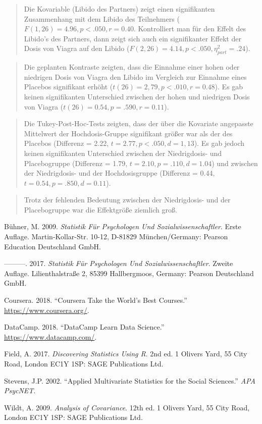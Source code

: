 \documentclass[]{article}
\begin{document}
\begin{quote}
Die Kovariable (Libido des Partners) zeigt einen signifikanten
Zusammenhang mit dem Libido des Teilnehmers
(\(F(1, 26) = 4.96, p < .050, r = 0.40\). Kontrolliert man für den
Effelt des Libido's des Partners, dann zeigt sich auch ein signifikanter
Effekt der Dosis von Viagra auf den Libido
(\(F(2, 26) = 4.14, p < .050, \eta^2_{part} = .24\)).
\end{quote}

\begin{quote}
Die geplanten Kontraste zeigten, dass die Einnahme einer hohen oder
niedrigen Dosis von Viagra den Libido im Vergleich zur Einnahme eines
Placebos signifikant erhöht (\(t(26) = 2,79, p < .010, r = 0.48\)). Es
gab keinen signifikanten Unterschied zwischen der hohen und niedrigen
Dosis von Viagra (\(t(26) = 0.54, p = .590, r = 0.11\)).
\end{quote}

\begin{quote}
Die Tukey-Post-Hoc-Tests zeigten, dass der über die Kovariate angepasste
Mittelwert der Hochdosis-Gruppe signifikant größer war als der des
Placebos (Differenz = 2.22, \(t = 2.77, p < .050, d = 1,13\)). Es gab
jedoch keinen signifikanten Unterschied zwischen der Niedrigdosis- und
Placebogruppe (Differenz = 1.79, \(t = 2.10, p = .110, d = 1.04\)) und
zwischen der Niedrigdosis- und der Hochdosisgruppe (Differenz = 0.44,
\(t = 0.54, p = .850, d = 0.11\)).
\end{quote}

\begin{quote}
Trotz der fehlenden Bedeutung zwischen der Niedrigdosis- und der
Placebogruppe war die Effektgröße ziemlich groß.
\end{quote}

\hypertarget{refs}{}
\hypertarget{ref-Buehner1}{}
Bühner, M. 2009. \emph{Statistik Für Psychologen Und
Sozialwissenschaftler}. Erste Auflage. Martin-Kollar-Str. 10-12, D-81829
München/Germany: Pearson Education Deutschland GmbH.

\hypertarget{ref-Buehner2}{}
---------. 2017. \emph{Statistik Für Psychologen Und
Sozialwissenschaftler}. Zweite Auflage. Lilienthalstraße 2, 85399
Hallbergmoos, Germany: Pearson Deutschland GmbH.

\hypertarget{ref-CourseRa}{}
Coursera. 2018. ``Coursera Take the World's Best Courses.''
\url{https://www.coursera.org/}.

\hypertarget{ref-DataCamp}{}
DataCamp. 2018. ``DataCamp Learn Data Science.''
\url{https://www.datacamp.com/}.

\hypertarget{ref-Field}{}
Field, A. 2017. \emph{Discovering Statistics Using R}. 2nd ed. 1 Olivers
Yard, 55 City Road, London EC1Y 1SP: SAGE Publications Ltd.

\hypertarget{ref-Stevens}{}
Stevens, J.P. 2002. ``Applied Multivariate Statistics for the Social
Sciences.'' \emph{APA PsycNET}.

\hypertarget{ref-Wildt}{}
Wildt, A. 2009. \emph{Analysis of Covariance}. 12th ed. 1 Olivers Yard,
55 City Road, London EC1Y 1SP: SAGE Publications Ltd.
\end{document}
